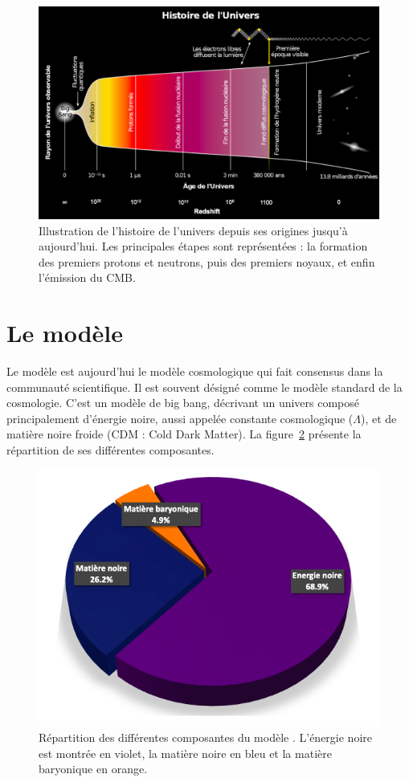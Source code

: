 \begin{figure}
  \centering
  \includegraphics[scale=0.35]{univershistory2}
  \caption{Illustration de l'histoire de l'univers depuis ses origines jusqu'à aujourd'hui. Les principales étapes sont représentées : la formation des premiers protons et neutrons, puis des premiers noyaux, et enfin l'émission du CMB.}
  \label{fig:univershistory}
\end{figure}


\section{Le modèle \lcdm{}}

Le modèle \lcdm{} est aujourd'hui le modèle cosmologique qui fait consensus dans la communauté scientifique. Il est souvent désigné comme le modèle standard de la cosmologie. C'est un modèle de big bang, décrivant un univers composé principalement d'énergie noire, aussi appelée constante cosmologique ($\Lambda$), et de matière noire froide (CDM : Cold Dark Matter). La figure~\ref{fig:lcdm} présente la répartition de ses différentes composantes.
\begin{figure}
  \centering
  \includegraphics[scale=0.5]{lcdm}
  \caption{Répartition des différentes composantes du modèle \lcdm{}. L'énergie noire est montrée en violet, la matière noire en bleu et la matière baryonique en orange.}
  \label{fig:lcdm}
\end{figure}

